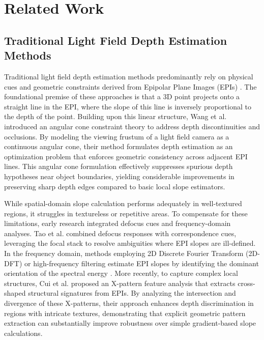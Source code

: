 \documentclass[lettersize,journal]{IEEEtran}
\begin{document}
\section{Related Work}

\subsection{Traditional Light Field Depth Estimation Methods}

Traditional light field depth estimation methods predominantly rely on physical cues and geometric constraints derived from Epipolar Plane Images (EPIs) . The foundational premise of these approaches is that a 3D point projects onto a straight line in the EPI, where the slope of this line is inversely proportional to the depth of the point. Building upon this linear structure, Wang et al.  introduced an angular cone constraint theory to address depth discontinuities and occlusions. By modeling the viewing frustum of a light field camera as a continuous angular cone, their method formulates depth estimation as an optimization problem that enforces geometric consistency across adjacent EPI lines. This angular cone formulation effectively suppresses spurious depth hypotheses near object boundaries, yielding considerable improvements in preserving sharp depth edges compared to basic local slope estimators.

While spatial-domain slope calculation performs adequately in well-textured regions, it struggles in textureless or repetitive areas. To compensate for these limitations, early research integrated defocus cues and frequency-domain analyses. Tao et al.  combined defocus responses with correspondence cues, leveraging the focal stack to resolve ambiguities where EPI slopes are ill-defined. In the frequency domain, methods employing 2D Discrete Fourier Transform (2D-DFT) or high-frequency filtering estimate EPI slopes by identifying the dominant orientation of the spectral energy . More recently, to capture complex local structures, Cui et al.  proposed an X-pattern feature analysis that extracts cross-shaped structural signatures from EPIs. By analyzing the intersection and divergence of these X-patterns, their approach enhances depth discrimination in regions with intricate textures, demonstrating that explicit geometric pattern extraction can substantially improve robustness over simple gradient-based slope calculations.
\end{document}
